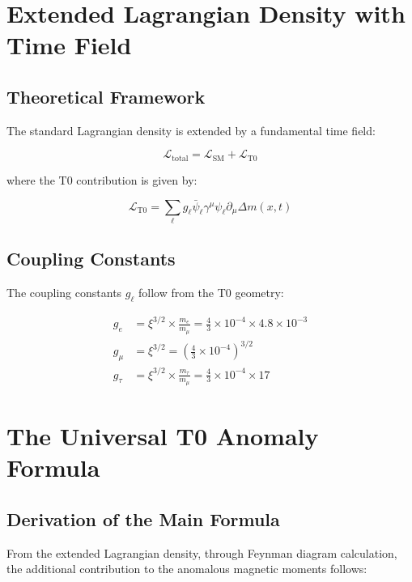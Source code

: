 \documentclass[12pt,a4paper]{article}
\newcommand{\xipar}{\xi}
\newcommand{\Deltam}{\Delta m}
\begin{document}
	\section{Extended Lagrangian Density with Time Field}
	
	\subsection{Theoretical Framework}
	
	The standard Lagrangian density is extended by a fundamental time field:
	
	\begin{equation}
		\mathcal{L}_{\text{total}} = \mathcal{L}_{\text{SM}} + \mathcal{L}_{\text{T0}}
	\end{equation}
	
	where the T0 contribution is given by:
	
	\begin{equation}
		\mathcal{L}_{\text{T0}} = \sum_\ell g_\ell \bar{\psi}_\ell \gamma^\mu \psi_\ell \partial_\mu \Deltam(x,t)
	\end{equation}
	
	\subsection{Coupling Constants}
	
	The coupling constants $g_\ell$ follow from the T0 geometry:
	
	\begin{align}
		g_e &= \xipar^{3/2} \times \frac{m_e}{m_\mu} = \frac{4}{3} \times 10^{-4} \times 4.8 \times 10^{-3} \\
		g_\mu &= \xipar^{3/2} = \left(\frac{4}{3} \times 10^{-4}\right)^{3/2} \\
		g_\tau &= \xipar^{3/2} \times \frac{m_\tau}{m_\mu} = \frac{4}{3} \times 10^{-4} \times 17
	\end{align}
	
	\section{The Universal T0 Anomaly Formula}
	
	\subsection{Derivation of the Main Formula}
	
	From the extended Lagrangian density, through Feynman diagram calculation, the additional contribution to the anomalous magnetic moments follows:
	
\end{document}
